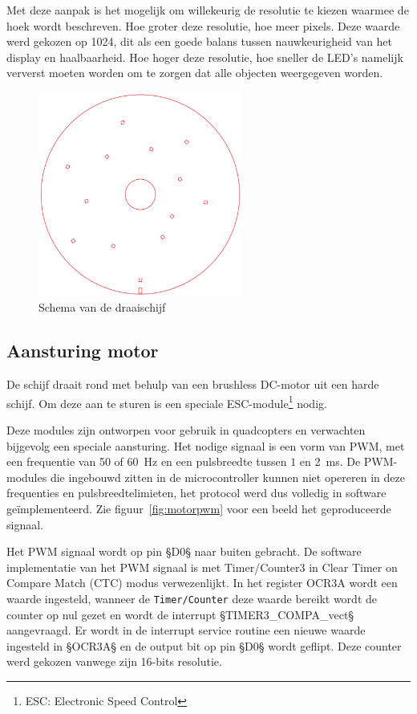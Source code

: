 \documentclass[12pt]{ugentreport}
\begin{document}
Met deze aanpak is het mogelijk om willekeurig de resolutie te kiezen
waarmee de hoek wordt beschreven. Hoe groter deze resolutie,
hoe meer pixels. Deze waarde werd gekozen op 1024, dit als een goede balans
tussen nauwkeurigheid van het display en haalbaarheid. Hoe hoger deze resolutie,
hoe sneller de LED's namelijk ververst moeten worden om te zorgen dat alle
objecten weergegeven worden.

\begin{figure}
  \centering
  \includegraphics[width=0.6\textwidth]{img/schijf.jpg}
  \caption{Schema van de draaischijf}
  \label{fig:schijf}
\end{figure}

\subsection{Aansturing motor}
De schijf draait rond met behulp van een brushless DC-motor uit een harde schijf.
Om deze aan te sturen is een speciale ESC-module\footnote{ESC: Electronic Speed Control} nodig.

Deze modules zijn ontworpen voor gebruik in quadcopters en verwachten bijgevolg
een speciale aansturing.
Het nodige signaal is een vorm van PWM, met een frequentie van 50 of
\SI{60}{\hertz}
en een pulsbreedte tussen $1$ en \SI{2}{\milli\second}.
De PWM-modules die ingebouwd zitten in de microcontroller kunnen niet opereren
in deze frequenties en pulsbreedtelimieten,
het protocol werd dus volledig in software geïmplementeerd.
Zie figuur~\ref{fig:motorpwm} voor een beeld het geproduceerde signaal.

Het PWM signaal wordt op pin §D0§ naar buiten gebracht. De software implementatie
van het PWM signaal is met Timer/Counter3 in Clear Timer on Compare Match (CTC)
modus verwezenlijkt. In het register OCR3A wordt een waarde ingesteld, wanneer de \texttt{Timer/Counter}
deze waarde bereikt wordt de counter op nul gezet en wordt de interrupt §TIMER3_COMPA_vect§
aangevraagd. Er wordt in de interrupt service routine een nieuwe waarde ingesteld
in §OCR3A§ en de output bit op pin §D0§ wordt geflipt. Deze counter werd gekozen
vanwege zijn 16-bits resolutie.
\end{document}
